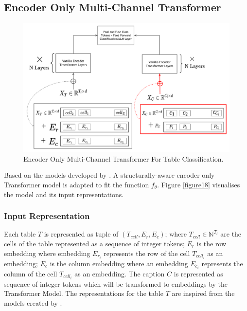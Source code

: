 \subsection{Encoder Only Multi-Channel Transformer}
\label{table_classification:models:encoder-model}
\begin{figure}[h]
    \centering
    \includegraphics[width=\maxwidth{\textwidth}]{src/images/Pic-Export-Enc-Trans-Thesis.pdf}
    \caption{Encoder Only Multi-Channel Transformer For Table Classification. }
    \label{figure\arabic{figurecounter}}
\end{figure}
Based on the models developed by \cite{deng2020turl}. A structurally-aware encoder only Transformer model is adapted to fit the function $f_\theta$. Figure \ref{figure18} visualises the model and its input representations.

\subsubsection{Input Representation}
\label{table_classification:models:encoder-model:input-rep}
Each table $T$ is represented as tuple of $(T_{cell},E_r,E_c)$; where $T_{cell} \in \mathbb{N}^{T_l}$ are the cells of the table represented as a sequence of integer tokens; $E_r$ is the row embedding where embedding $E_{r_{i}}$ represents the row of the cell $T_{cell_{i}}$ as an embedding;  $E_c$ is the column embedding where an embedding $E_{c_{i}}$ represents the column of the cell $T_{cell_{i}}$ as an embedding. The caption $C$ is represented as sequence of integer tokens which will be transformed to embeddings by the Transformer Model. The representations for the table $T$ are inspired from the models created by \cite{deng2020turl}. 

